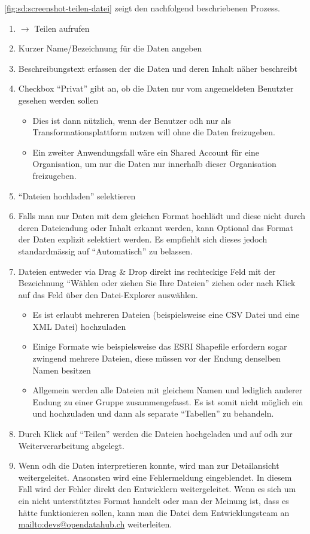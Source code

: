 \cref{fig:sd:screenshot-teilen-datei} zeigt den nachfolgend beschriebenen Prozess.

\begin{enumerate}
\item {} $\to$ Teilen aufrufen
\item Kurzer Name/Bezeichnung für die Daten angeben
\item Beschreibungstext erfassen der die Daten und deren Inhalt näher beschreibt
\item Checkbox ``Privat'' gibt an, ob die Daten nur vom angemeldeten Benutzter gesehen werden sollen
	\begin{itemize}
	\item Dies ist dann nützlich, wenn der Benutzer \acl{odh} nur als Transformationsplattform nutzen will ohne die Daten freizugeben.
	\item Ein zweiter Anwendungsfall wäre ein Shared Account für eine Organisation, um nur die Daten nur innerhalb dieser Organisation freizugeben.
	\end{itemize}
\item ``Dateien hochladen'' selektieren
\item Falls man nur Daten mit dem gleichen Format hochlädt und diese nicht durch deren Dateiendung oder Inhalt erkannt werden, kann Optional das Format der Daten explizit selektiert werden. Es empfiehlt sich dieses jedoch standardmässig auf ``Automatisch'' zu belassen.
\item Dateien entweder via Drag \& Drop direkt ins rechteckige Feld mit der Bezeichnung ``Wählen oder ziehen Sie Ihre Dateien'' ziehen oder nach Klick auf das Feld über den Datei-Explorer auswählen.
	\begin{itemize}
	\item Es ist erlaubt mehreren Dateien (beispielsweise eine CSV Datei und eine XML Datei) hochzuladen
	\item Einige Formate wie beispielsweise das ESRI Shapefile erfordern sogar zwingend mehrere Dateien, diese müssen vor der Endung denselben Namen besitzen
	\item Allgemein werden alle Dateien mit gleichem Namen und lediglich anderer Endung zu einer Gruppe zusammengefasst. Es ist somit nicht möglich ein  und  hochzuladen und dann als separate ``Tabellen'' zu behandeln.
	\end{itemize}
\item Durch Klick auf ``Teilen'' werden die Dateien hochgeladen und auf \acl{odh} zur Weiterverarbeitung abgelegt.
\item Wenn \acl{odh} die Daten interpretieren konnte, wird man zur Detailansicht weitergeleitet. Ansonsten wird eine Fehlermeldung eingeblendet. In diesem Fall wird der Fehler direkt den Entwicklern weitergeleitet. Wenn es sich um ein nicht unterstütztes Format handelt oder man der Meinung ist, dass es hätte funktionieren sollen, kann man die Datei dem Entwicklungsteam an \url{mailto:devs@opendatahub.ch} weiterleiten.
\end{enumerate}

